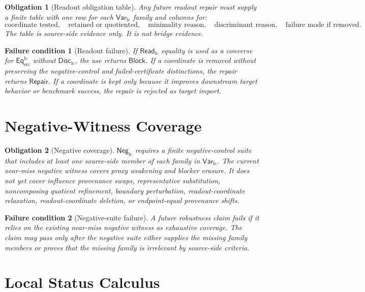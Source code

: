 \documentclass[11pt]{article}
\newcommand{\EqLC}{\mathsf{Eq}_{\mathrm{src}}^{\mathrm{lc}}}
\newcommand{\ReadLC}{\mathsf{Read}_{\mathrm{lc}}}
\newcommand{\VarLC}{\mathsf{Var}_{\mathrm{lc}}}
\newcommand{\DiscLC}{\mathsf{Disc}_{\mathrm{lc}}}
\newcommand{\NegLC}{\mathsf{Neg}_{\mathrm{lc}}}
\newcommand{\Block}{\mathsf{Block}}
\newcommand{\Repair}{\mathsf{Repair}}
\newtheorem{obligation}{Obligation}
\newtheorem{failurecondition}{Failure condition}
\begin{document}
\begin{obligation}[Readout obligation table]
Any future readout repair must supply a finite table with one row for
each \(\VarLC\) family and columns for:
\[
\text{coordinate tested},\quad
\text{retained or quotiented},\quad
\text{minimality reason},\quad
\text{discriminant reason},\quad
\text{failure mode if removed}.
\]
The table is source-side evidence only. It is not bridge evidence.
\end{obligation}

\begin{failurecondition}[Readout failure]
If \(\ReadLC\) equality is used as a converse for \(\EqLC\) without
\(\DiscLC\), the use returns \(\Block\). If a coordinate is removed
without preserving the negative-control and failed-certificate
distinctions, the repair returns \(\Repair\). If a coordinate is kept
only because it improves downstream target behavior or benchmark
success, the repair is rejected as target import.
\end{failurecondition}

\section{Negative-Witness Coverage}

\begin{obligation}[Negative coverage]
\(\NegLC\) requires a finite negative-control suite that includes at
least one source-side member of each family in \(\VarLC\). The current
near-miss negative witness covers proxy weakening and blocker erasure.
It does not yet cover influence provenance swaps, representative
substitution, noncomposing quotient refinement, boundary perturbation,
readout-coordinate relaxation, readout-coordinate deletion, or
endpoint-equal provenance shifts.
\end{obligation}

\begin{failurecondition}[Negative-suite failure]
A future robustness claim fails if it relies on the existing near-miss
negative witness as exhaustive coverage. The claim may pass only after
the negative suite either supplies the missing family members or proves
that the missing family is irrelevant by source-side criteria.
\end{failurecondition}

\section{Local Status Calculus}
\end{document}
